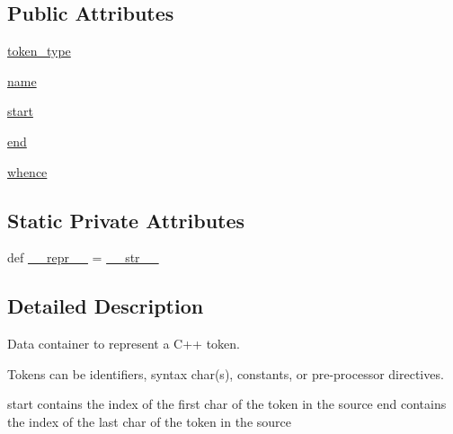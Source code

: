 \subsection*{Public Attributes}
\begin{DoxyCompactItemize}
\item 
\mbox{\hyperlink{classgoogletest-master_1_1googlemock_1_1scripts_1_1generator_1_1cpp_1_1tokenize_1_1_token_aab2d509ec2280d2e77cf354d375272be}{token\+\_\+type}}
\item 
\mbox{\hyperlink{classgoogletest-master_1_1googlemock_1_1scripts_1_1generator_1_1cpp_1_1tokenize_1_1_token_acf52f80edc551beb42cf476313c12fef}{name}}
\item 
\mbox{\hyperlink{classgoogletest-master_1_1googlemock_1_1scripts_1_1generator_1_1cpp_1_1tokenize_1_1_token_a56daf1bfd640aa7d5ce7ba73cdf90925}{start}}
\item 
\mbox{\hyperlink{classgoogletest-master_1_1googlemock_1_1scripts_1_1generator_1_1cpp_1_1tokenize_1_1_token_a4d23764af29783fd740dc4aa642cab31}{end}}
\item 
\mbox{\hyperlink{classgoogletest-master_1_1googlemock_1_1scripts_1_1generator_1_1cpp_1_1tokenize_1_1_token_a922f94a3c4942ddd37d692078fcbcb1f}{whence}}
\end{DoxyCompactItemize}
\subsection*{Static Private Attributes}
\begin{DoxyCompactItemize}
\item 
def \mbox{\hyperlink{classgoogletest-master_1_1googlemock_1_1scripts_1_1generator_1_1cpp_1_1tokenize_1_1_token_a482653e75e605da0dfd86e8b6d10c563}{\+\_\+\+\_\+repr\+\_\+\+\_\+}} = \mbox{\hyperlink{classgoogletest-master_1_1googlemock_1_1scripts_1_1generator_1_1cpp_1_1tokenize_1_1_token_aef6cf5cd9aec802259309c4733093d02}{\+\_\+\+\_\+str\+\_\+\+\_\+}}
\end{DoxyCompactItemize}


\subsection{Detailed Description}
\begin{DoxyVerb}Data container to represent a C++ token.

Tokens can be identifiers, syntax char(s), constants, or
pre-processor directives.

start contains the index of the first char of the token in the source
end contains the index of the last char of the token in the source
\end{DoxyVerb}
 

